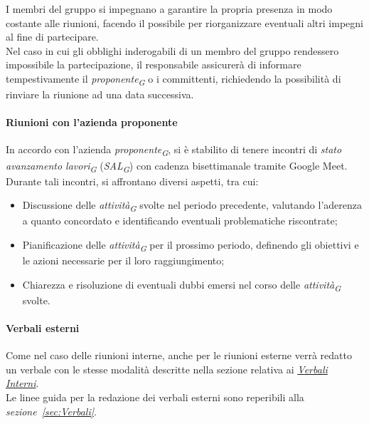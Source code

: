\vspace{0.2cm}

I membri del gruppo si impegnano a garantire la propria presenza in modo costante alle riunioni, facendo il possibile per riorganizzare eventuali altri impegni al fine di partecipare. \\
Nel caso in cui gli obblighi inderogabili di un membro del gruppo rendessero impossibile la partecipazione, il responsabile assicurerà di informare tempestivamente il \textit{proponente}\textsubscript{\textit{G}} o i committenti, richiedendo la possibilità di rinviare la riunione ad una data successiva.

\paragraph*{Riunioni con l'azienda proponente}
In accordo con l'azienda \textit{proponente}\textsubscript{\textit{G}}, si è stabilito di tenere incontri di \textit{stato avanzamento lavori}\textsubscript{\textit{G}} (\textit{SAL}\textsubscript{\textit{G}}) con cadenza bisettimanale tramite Google Meet. \\
Durante tali incontri, si affrontano diversi aspetti, tra cui:
\begin{itemize}
		\item Discussione delle \textit{attività}\textsubscript{\textit{G}} svolte nel periodo precedente, valutando l'aderenza a quanto concordato e identificando eventuali problematiche riscontrate;
		\item Pianificazione delle \textit{attività}\textsubscript{\textit{G}} per il prossimo periodo, definendo gli obiettivi e le azioni necessarie per il loro raggiungimento;
		\item Chiarezza e risoluzione di eventuali dubbi emersi nel corso delle \textit{attività}\textsubscript{\textit{G}} svolte.
\end{itemize}

\paragraph*{Verbali esterni}
Come nel caso delle riunioni interne, anche per le riunioni esterne verrà redatto un verbale con le stesse modalità descritte nella sezione relativa ai \hyperlink{par:verbaliInterni}{\textit{Verbali Interni}}. \\
Le linee guida per la redazione dei verbali esterni sono reperibili alla \textit{sezione~\ref{sec:Verbali}}.

